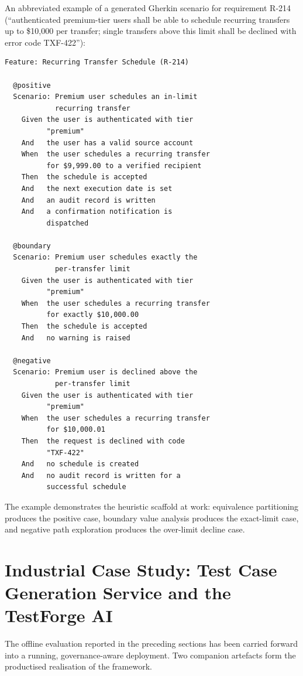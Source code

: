 \documentclass[conference]{IEEEtran}
\begin{document}
An abbreviated example of a generated Gherkin scenario for requirement R-214 (``authenticated premium-tier users shall be able to schedule recurring transfers up to \$10{,}000 per transfer; single transfers above this limit shall be declined with error code TXF-422''):

\begin{lstlisting}
Feature: Recurring Transfer Schedule (R-214)

  @positive
  Scenario: Premium user schedules an in-limit
            recurring transfer
    Given the user is authenticated with tier
          "premium"
    And   the user has a valid source account
    When  the user schedules a recurring transfer
          for $9,999.00 to a verified recipient
    Then  the schedule is accepted
    And   the next execution date is set
    And   an audit record is written
    And   a confirmation notification is
          dispatched

  @boundary
  Scenario: Premium user schedules exactly the
            per-transfer limit
    Given the user is authenticated with tier
          "premium"
    When  the user schedules a recurring transfer
          for exactly $10,000.00
    Then  the schedule is accepted
    And   no warning is raised

  @negative
  Scenario: Premium user is declined above the
            per-transfer limit
    Given the user is authenticated with tier
          "premium"
    When  the user schedules a recurring transfer
          for $10,000.01
    Then  the request is declined with code
          "TXF-422"
    And   no schedule is created
    And   no audit record is written for a
          successful schedule
\end{lstlisting}

The example demonstrates the heuristic scaffold at work: equivalence partitioning produces the positive case, boundary value analysis produces the exact-limit case, and negative path exploration produces the over-limit decline case.

\section{Industrial Case Study: Test Case Generation Service and the TestForge AI}
\label{sec:case_study}

The offline evaluation reported in the preceding sections has been carried forward into a running, governance-aware deployment. Two companion artefacts form the productised realisation of the framework.
\end{document}
